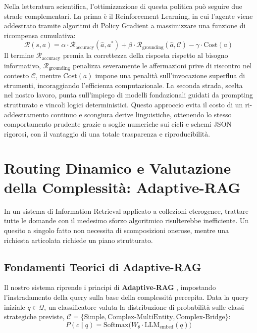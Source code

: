 Nella letteratura scientifica, l'ottimizzazione di questa politica può seguire due strade complementari. La prima è il Reinforcement Learning, in cui l'agente viene addestrato tramite algoritmi di Policy Gradient a massimizzare una funzione di ricompensa cumulativa:
\begin{equation}
\mathcal{R}(s, a) = \alpha \cdot \mathcal{R}_{\text{accuracy}}(\hat{a}, a^*) + \beta \cdot \mathcal{R}_{\text{grounding}}(\hat{a}, \mathcal{C}) - \gamma \cdot \text{Cost}(a)
\end{equation}
Il termine $\mathcal{R}_{\text{accuracy}}$ premia la correttezza della risposta rispetto al bisogno informativo, $\mathcal{R}_{\text{grounding}}$ penalizza severamente le affermazioni prive di riscontro nel contesto $\mathcal{C}$, mentre $\text{Cost}(a)$ impone una penalità sull'invocazione superflua di strumenti, incoraggiando l'efficienza computazionale. La seconda strada, scelta nel nostro lavoro, punta sull'impiego di modelli fondazionali guidati da prompting strutturato e vincoli logici deterministici. Questo approccio evita il costo di un ri-addestramento continuo e scongiura derive linguistiche, ottenendo lo stesso comportamento prudente grazie a soglie numeriche sui cicli e schemi JSON rigorosi, con il vantaggio di una totale trasparenza e riproducibilità.

\section{Routing Dinamico e Valutazione della Complessità: Adaptive-RAG}
\label{sec:adaptive_rag}

In un sistema di Information Retrieval applicato a collezioni eterogenee, trattare tutte le domande con il medesimo sforzo algoritmico risulterebbe inefficiente. Un quesito a singolo fatto non necessita di scomposizioni onerose, mentre una richiesta articolata richiede un piano strutturato.

\subsection{Fondamenti Teorici di Adaptive-RAG}
Il nostro sistema riprende i principi di \textbf{Adaptive-RAG} \cite{jeong2024adaptiverag}, impostando l'instradamento della query sulla base della complessità percepita. Data la query iniziale $q \in \mathcal{Q}$, un classificatore valuta la distribuzione di probabilità sulle classi strategiche previste, $\mathcal{C} = \{\text{Simple}, \text{Complex-MultiEntity}, \text{Complex-Bridge}\}$:
\begin{equation}
P(c \mid q) = \text{Softmax}\big(W_\theta \cdot \text{LLM}_{\text{embed}}(q)\big)
\end{equation}

